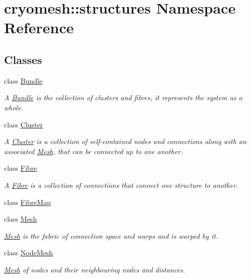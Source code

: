 \hypertarget{namespacecryomesh_1_1structures}{\section{cryomesh\-:\-:structures \-Namespace \-Reference}
\label{namespacecryomesh_1_1structures}
}
\subsection*{\-Classes}
\begin{DoxyCompactItemize}
\item 
class \hyperlink{classcryomesh_1_1structures_1_1Bundle}{\-Bundle}
\begin{DoxyCompactList}\small\item\em \-A \hyperlink{classcryomesh_1_1structures_1_1Bundle}{\-Bundle} is the collection of clusters and fibres, it represents the system as a whole. \end{DoxyCompactList}\item 
class \hyperlink{classcryomesh_1_1structures_1_1Cluster}{\-Cluster}
\begin{DoxyCompactList}\small\item\em \-A \hyperlink{classcryomesh_1_1structures_1_1Cluster}{\-Cluster} is a collection of self-\/contained nodes and connections along with an associated \hyperlink{classcryomesh_1_1structures_1_1Mesh}{\-Mesh}, that can be connected up to one another. \end{DoxyCompactList}\item 
class \hyperlink{classcryomesh_1_1structures_1_1Fibre}{\-Fibre}
\begin{DoxyCompactList}\small\item\em \-A \hyperlink{classcryomesh_1_1structures_1_1Fibre}{\-Fibre} is a collection of connections that connect one structure to another. \end{DoxyCompactList}\item 
class \hyperlink{classcryomesh_1_1structures_1_1FibreMap}{\-Fibre\-Map}
\item 
class \hyperlink{classcryomesh_1_1structures_1_1Mesh}{\-Mesh}
\begin{DoxyCompactList}\small\item\em \hyperlink{classcryomesh_1_1structures_1_1Mesh}{\-Mesh} is the fabric of connection space and warps and is warped by it. \end{DoxyCompactList}\item 
class \hyperlink{classcryomesh_1_1structures_1_1NodeMesh}{\-Node\-Mesh}
\begin{DoxyCompactList}\small\item\em \hyperlink{classcryomesh_1_1structures_1_1Mesh}{\-Mesh} of nodes and their neighbouring nodes and distances. \end{DoxyCompactList}\end{DoxyCompactItemize}
